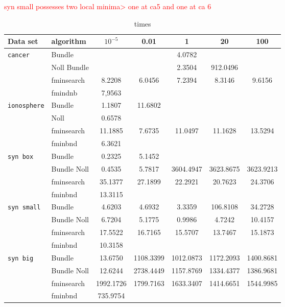 \textcolor{red}{syn small possesses two local minima> one at ca5 and one at ca 6}


\begin{center}
\begin{table}[H]%
	\begin{tabular}{llccccc}
		\hline
    Data set & algorithm & \(10^{-5}\) & 0.01 & 1 & 20 & 100 \\
		\hline
		\texttt{cancer} & Bundle & & & 4.0782  \\
		 & Noll Bundle & & & 2.3504 & 912.0496 \\
		 &  fminsearch & 8.2208 & 6.0456 & 7.2394 & 8.3146 & 9.6156 \\
		 & fmindnb & 7,9563 \\
		\texttt{ionosphere} & Bundle & 1.1807 &	11.6802 \\
		 & Noll & 0.6578 \\
		 & fminsearch & 11.1885 & 7.6735 & 11.0497 & 11.1628 &	13.5294 \\
		 & fminbnd & 6.3621 \\
		\texttt{syn box} & Bundle & 0.2325 & 5.1452 \\
		 & Bundle Noll & 0.4535 & 5.7817 &	3604.4947 &	3623.8675 & 	3623.9213 \\
		 & fminsearch & 35.1377 & 27.1899 &	22.2921 & 20.7623 &	24.3706\\
		 & fminbnd & 13.3115\\
		\texttt{syn small} & Bundle & 4.6203 &	4.6932 &	3.3359 &	106.8108 &	34.2728 \\
		 & Bundle Noll & 6.7204 &	5.1775 &	0.9986	& 4.7242 & 10.4157 \\
		 & fminsearch & 17.5522 & 16.7165 &	15.5707 & 13.7467 &	15.1873 \\
		 & fminbnd & 10.3158 \\
		\texttt{syn big} & Bundle & 13.6750 & 1108.3399 & 1012.0873 &	1172.2093 &	1400.8681 \\
		 & Bundle Noll & 12.6244 &	2738.4449 &	1157.8769 &	1334.4377 &	1386.9681\\
		 & fminsearch & 1992.1726 &	1799.7163 &	1633.3407 & 1414.6651 &	1544.9985\\
		 & fminbnd & 735.9754 \\
	\end{tabular}
	\caption{times}
\end{table}
\end{center}

